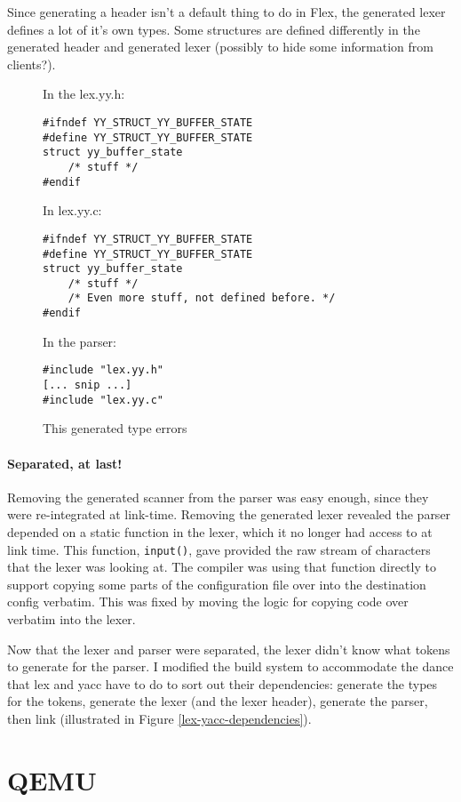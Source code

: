 \documentclass[12pt]{article}
\newcommand{\code}[1]{{\tt #1}}
\begin{document}
Since generating a header isn't a default thing to do in Flex, the generated
lexer defines a lot of it's own types. Some structures are defined differently
in the generated header and generated lexer (possibly to hide some information
from clients?).

\begin{figure}
\label{include-c-h}\caption{This generated type errors}
In the lex.yy.h:
\begin{verbatim}
#ifndef YY_STRUCT_YY_BUFFER_STATE
#define YY_STRUCT_YY_BUFFER_STATE
struct yy_buffer_state
    /* stuff */
#endif
\end{verbatim}

In lex.yy.c:
\begin{verbatim}
#ifndef YY_STRUCT_YY_BUFFER_STATE
#define YY_STRUCT_YY_BUFFER_STATE
struct yy_buffer_state
    /* stuff */
    /* Even more stuff, not defined before. */
#endif
\end{verbatim}

In the parser:
\begin{verbatim}
#include "lex.yy.h"
[... snip ...]
#include "lex.yy.c"
\end{verbatim}
\end{figure}

\paragraph{Separated, at last!}
Removing the generated scanner from the parser was easy enough, since they were
re-integrated at link-time. Removing the generated lexer revealed the 
parser depended on a static function in the lexer, which it no longer had
access to at link time. This function, \code{input()}, gave provided the raw
stream of characters that the lexer was looking at. The compiler was using that
function directly to support copying some parts of the configuration file over
into the destination config verbatim. This was fixed by moving the logic for
copying code over verbatim into the lexer.

Now that the lexer and parser were separated, the lexer didn't know what tokens
to generate for the parser. I modified the build system to accommodate the dance
that lex and yacc have to do to sort out their dependencies: generate the types
for the tokens, generate the lexer (and the lexer header), generate the parser,
then link (illustrated in Figure \ref{lex-yacc-dependencies}).

\section{QEMU}
\end{document}
